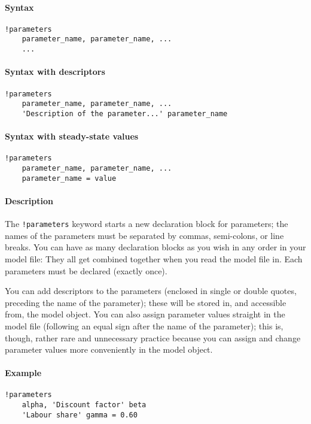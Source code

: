 


	\paragraph{Syntax}

\begin{verbatim}
!parameters
    parameter_name, parameter_name, ...
    ...
\end{verbatim}

\paragraph{Syntax with descriptors}

\begin{verbatim}
!parameters
    parameter_name, parameter_name, ...
    'Description of the parameter...' parameter_name
\end{verbatim}

\paragraph{Syntax with steady-state
values}

\begin{verbatim}
!parameters
    parameter_name, parameter_name, ...
    parameter_name = value
\end{verbatim}

\paragraph{Description}

The \texttt{!parameters} keyword starts a new declaration block for
parameters; the names of the parameters must be separated by commas,
semi-colons, or line breaks. You can have as many declaration blocks as
you wish in any order in your model file: They all get combined together
when you read the model file in. Each parameters must be declared
(exactly once).

You can add descriptors to the parameters (enclosed in single or double
quotes, preceding the name of the parameter); these will be stored in,
and accessible from, the model object. You can also assign parameter
values straight in the model file (following an equal sign after the
name of the parameter); this is, though, rather rare and unnecessary
practice because you can assign and change parameter values more
conveniently in the model object.

\paragraph{Example}

\begin{verbatim}
!parameters
    alpha, 'Discount factor' beta
    'Labour share' gamma = 0.60
\end{verbatim}


